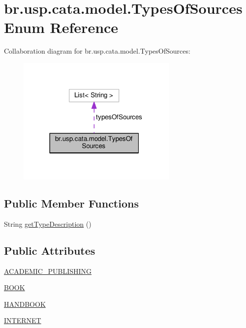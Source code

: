 \hypertarget{enumbr_1_1usp_1_1cata_1_1model_1_1_types_of_sources}{\section{br.\+usp.\+cata.\+model.\+Types\+Of\+Sources Enum Reference}
\label{enumbr_1_1usp_1_1cata_1_1model_1_1_types_of_sources}
}


Collaboration diagram for br.\+usp.\+cata.\+model.\+Types\+Of\+Sources\+:\nopagebreak
\begin{figure}[H]
\begin{center}
\leavevmode
\includegraphics[width=222pt]{enumbr_1_1usp_1_1cata_1_1model_1_1_types_of_sources__coll__graph}
\end{center}
\end{figure}
\subsection*{Public Member Functions}
\begin{DoxyCompactItemize}
\item 
String \hyperlink{enumbr_1_1usp_1_1cata_1_1model_1_1_types_of_sources_abacf5e6b888bc103d3a8dc39756362ea}{get\+Type\+Description} ()
\end{DoxyCompactItemize}
\subsection*{Public Attributes}
\begin{DoxyCompactItemize}
\item 
\hyperlink{enumbr_1_1usp_1_1cata_1_1model_1_1_types_of_sources_a1be77c8b37df7c9547d9518eaad11810}{A\+C\+A\+D\+E\+M\+I\+C\+\_\+\+P\+U\+B\+L\+I\+S\+H\+I\+N\+G}
\item 
\hyperlink{enumbr_1_1usp_1_1cata_1_1model_1_1_types_of_sources_ab83614e7710e716607362a3a2451d740}{B\+O\+O\+K}
\item 
\hyperlink{enumbr_1_1usp_1_1cata_1_1model_1_1_types_of_sources_af4bbee31c4eadc2f05ce949eb70bf64b}{H\+A\+N\+D\+B\+O\+O\+K}
\item 
\hyperlink{enumbr_1_1usp_1_1cata_1_1model_1_1_types_of_sources_a574f300d9b2bee7d49ccb97e23120fc6}{I\+N\+T\+E\+R\+N\+E\+T}
\end{DoxyCompactItemize}
